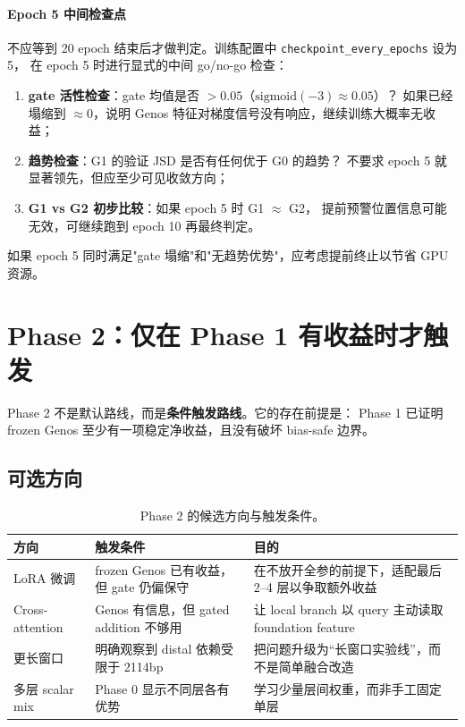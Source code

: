 \documentclass[11pt,a4paper]{ctexart}
\begin{document}
\paragraph{Epoch 5 中间检查点}
不应等到 20 epoch 结束后才做判定。训练配置中 \texttt{checkpoint\_every\_epochs} 设为 5，
在 epoch 5 时进行显式的中间 go/no-go 检查：

\begin{enumerate}[leftmargin=2em]
  \item \textbf{gate 活性检查}：gate 均值是否 $> 0.05$（$\text{sigmoid}(-3) \approx 0.05$）？
  如果已经塌缩到 $\approx 0$，说明 Genos 特征对梯度信号没有响应，继续训练大概率无收益；
  \item \textbf{趋势检查}：G1 的验证 JSD 是否有任何优于 G0 的趋势？
  不要求 epoch 5 就显著领先，但应至少可见收敛方向；
  \item \textbf{G1 vs G2 初步比较}：如果 epoch 5 时 G1 $\approx$ G2，
  提前预警位置信息可能无效，可继续跑到 epoch 10 再最终判定。
\end{enumerate}

如果 epoch 5 同时满足"gate 塌缩"和"无趋势优势"，应考虑提前终止以节省 GPU 资源。

\section{Phase 2：仅在 Phase 1 有收益时才触发}

Phase 2 不是默认路线，而是\textbf{条件触发路线}。它的存在前提是：
Phase 1 已证明 frozen Genos 至少有一项稳定净收益，且没有破坏 bias-safe 边界。

\subsection{可选方向}

\begin{table}[H]
\centering
\small
\caption{Phase 2 的候选方向与触发条件。}
\label{tab:phase2}
\begin{tabularx}{\textwidth}{l l Y}
\toprule
方向 & 触发条件 & 目的 \\
\midrule
LoRA 微调 & frozen Genos 已有收益，但 gate 仍偏保守 & 在不放开全参的前提下，适配最后 2--4 层以争取额外收益 \\
Cross-attention & Genos 有信息，但 gated addition 不够用 & 让 local branch 以 query 主动读取 foundation feature \\
更长窗口 & 明确观察到 distal 依赖受限于 2114bp & 把问题升级为“长窗口实验线”，而不是简单融合改造 \\
多层 scalar mix & Phase 0 显示不同层各有优势 & 学习少量层间权重，而非手工固定单层 \\
\bottomrule
\end{tabularx}
\end{table}
\end{document}
